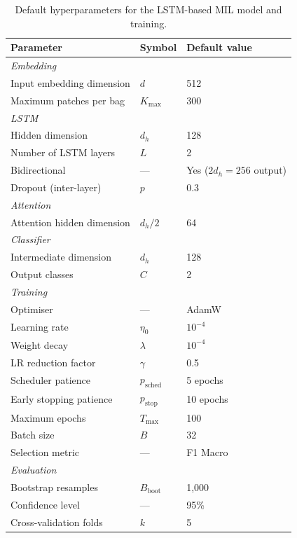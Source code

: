 \documentclass[11pt,a4paper]{article}
\begin{document}
\begin{table}[h]
\centering
\caption{Default hyperparameters for the LSTM-based MIL model and training.}
\label{tab:hyperparams}
\begin{tabular}{lll}
\toprule
\textbf{Parameter} & \textbf{Symbol} & \textbf{Default value} \\
\midrule
\multicolumn{3}{l}{\textit{Embedding}} \\
Input embedding dimension     & $d$               & 512 \\
Maximum patches per bag       & $K_{\max}$        & 300 \\
\midrule
\multicolumn{3}{l}{\textit{LSTM}} \\
Hidden dimension              & $d_h$             & 128 \\
Number of LSTM layers         & $L$               & 2 \\
Bidirectional                 & ---               & Yes ($2d_h = 256$ output) \\
Dropout (inter-layer)         & $p$               & 0.3 \\
\midrule
\multicolumn{3}{l}{\textit{Attention}} \\
Attention hidden dimension    & $d_h / 2$         & 64 \\
\midrule
\multicolumn{3}{l}{\textit{Classifier}} \\
Intermediate dimension        & $d_h$             & 128 \\
Output classes                & $C$               & 2 \\
\midrule
\multicolumn{3}{l}{\textit{Training}} \\
Optimiser                     & ---               & AdamW \\
Learning rate                 & $\eta_0$          & $10^{-4}$ \\
Weight decay                  & $\lambda$         & $10^{-4}$ \\
LR reduction factor           & $\gamma$          & 0.5 \\
Scheduler patience            & $p_{\text{sched}}$& 5 epochs \\
Early stopping patience       & $p_{\text{stop}}$ & 10 epochs \\
Maximum epochs                & $T_{\max}$        & 100 \\
Batch size                    & $B$               & 32 \\
Selection metric              & ---               & F1 Macro \\
\midrule
\multicolumn{3}{l}{\textit{Evaluation}} \\
Bootstrap resamples           & $B_{\text{boot}}$ & 1{,}000 \\
Confidence level              & ---               & 95\% \\
Cross-validation folds        & $k$               & 5 \\
\bottomrule
\end{tabular}
\end{table}
\end{document}
